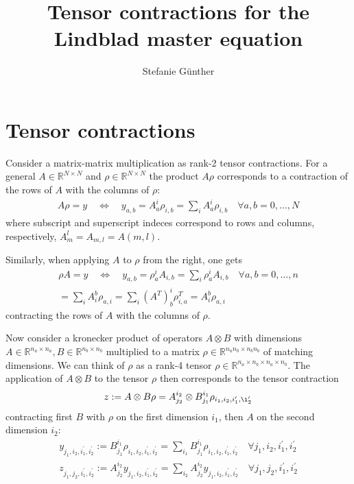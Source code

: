 \documentclass[letterpaper]{article}
\title{Tensor contractions for the Lindblad master equation}
\author{Stefanie G{\"u}nther}
\newcommand{\R}{\mathds{R}}
\begin{document}
\maketitle

\section{Tensor contractions}
Consider a matrix-matrix multiplication as rank-2 tensor contractions. For a general $A\in \R^{N\times N}$ and $\rho\in \R^{N\times N}$ the product $A\rho$ corresponds to a contraction of the rows of $A$ with the columns of $\rho$:
\begin{align}
    A \rho = y \quad \Leftrightarrow \quad y_{a,b} = A_a^{i} \rho_{i,b} = \sum_i A_a^i \rho_{i,b} \quad \forall a,b = 0,\dots, N
\end{align}
where subscript and superscript indeces correspond to rows and columns, respectively, $A_m^l = A_{m,l} = A(m,l)$. 

Similarly, when applying $A$ to $\rho$ from the right, one gets 
\begin{align}
    \rho A = y \quad \Leftrightarrow \quad y_{a,b} = \rho_a^{i} A_{i,b} = \sum_i \rho_a^i A_{i,b} \quad \forall a,b = 0,\dots, n \\
   = \sum_i A_i^b \rho_{a,i} = \sum_i (A^T)_b^i \rho^T_{i,a} = A_i^b \rho_{a,i}
\end{align}
contracting the rows of $A$ with the columns of $\rho$. 

Now consider a kronecker product of operators $A\otimes B$ with dimensions $A\in\R^{n_a\times n_a}, B\in\R^{n_b\times n_b}$ multiplied to a matrix $\rho \in \R^{n_an_b\times n_bn_b}$ of matching dimensions. We can think of $\rho$ as a rank-4 tensor $\rho\in\R^{n_a\times n_b \times n_a \times n_b}$. The application of $A\otimes B$ to the tensor $\rho$ then corresponds to the tensor contraction 
\begin{align}
    z := A\otimes B \rho = A_{j_2}^{i_2}\otimes B_{j_1}^{i_1} \rho_{i_1, i_2, i_1^{\prime}, \i_2^{\prime}}
\end{align}
contracting first $B$ with $\rho$ on the first dimension $i_1$, then $A$ on the second dimension $i_2$:
\begin{align}
    y_{j_1, i_2, i_1^{\prime}, i_2^{\prime}} := B_{j_1}^{i_1} \rho_{i_1, i_2, i_1^{\prime}, i_2^{\prime}} = \sum_{i_1} B_{j_1}^{i_1} \rho_{i_1, i_2, i_1^{\prime}, i_2^{\prime}} \quad \forall j_1,i_2,i_1^\prime, i_2^\prime\\
    z_{j_1, j_2, i_1^{\prime}, i_2^{\prime}} := A_{j_2}^{i_2} y_{j_1, i_2, i_1^{\prime}, i_2^{\prime}} = \sum_{i_2} A_{j_2}^{i_2} y_{j_1, i_2, i_1^{\prime}, i_2^{\prime}} \quad \forall j_1,j_2,i_1^\prime, i_2^\prime
\end{align}
\end{document}

